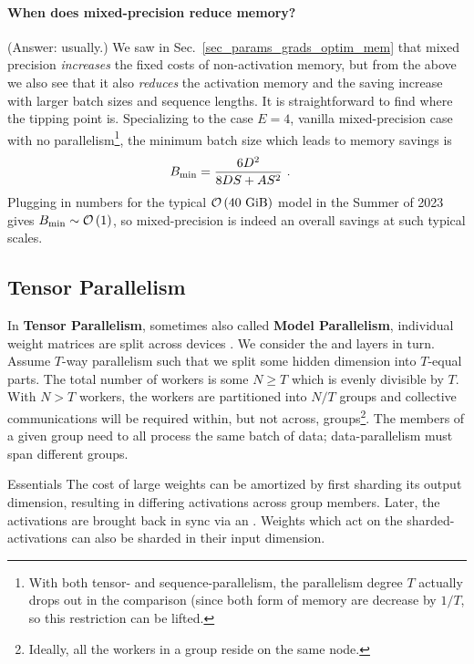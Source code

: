 \documentclass[11pt]{article}
\begin{document}
\paragraph{When does mixed-precision reduce memory?} (Answer: usually.) We saw in Sec.~\ref{sec_params_grads_optim_mem}
that mixed precision \textit{increases} the fixed costs of non-activation memory, but from the above
we also see that it also \textit{reduces} the activation memory and the saving increase with larger
batch sizes and sequence lengths. It is straightforward to find where the tipping point is.
Specializing to the case $E=4$, vanilla mixed-precision case with no parallelism\footnote{With both
tensor- and sequence-parallelism, the parallelism degree $ T $ actually drops out in the comparison
(since both form of memory are decrease by $ 1/T $, so this restriction  can be lifted.}, the
minimum batch size which leads to memory savings is
\begin{align}
  B _{ {\rm min}  } &= \frac{ 6 D ^{ 2 } }{ 8 DS + A S ^{ 2 } }\label{eq_min_mp_batch_size}\ .
\end{align}
Plugging in numbers for the typical $ \mathcal{O} \left( 40 \ {\rm GiB} \right)$ model in the Summer of
2023 gives $ B _{ {\rm min} } \sim \mathcal{O} \left( 1\right)  $, so mixed-precision is indeed an overall
savings at such typical scales.


\subsection{Tensor Parallelism \label{subsec_tensor_parallelism} }


In \textbf{Tensor Parallelism}, sometimes also called \textbf{Model Parallelism}, individual weight
matrices are split across devices \cite{shoeybi2020megatronlm}. We consider the  and
 layers in turn. Assume $ T $-way parallelism such that we split some
hidden dimension into $ T $-equal parts. The total number of workers is some $ N \ge T $ which is
evenly divisible by $ T $. With $ N >T $ workers, the workers are partitioned into $ N/T $ groups
and collective communications will be required within, but not across, groups\footnote{Ideally, all
the workers in a group reside on the same node.}. The members of a given group need to all process
the same batch of data; data-parallelism must span different groups.


\begin{nicebox}{Essentials}
The cost of large weights can be amortized by first sharding its output dimension, resulting in
differing activations across group members. Later, the activations are brought back in sync via
an . Weights which act on the sharded-activations can also be sharded in their
input dimension.
\end{nicebox}
\end{document}
